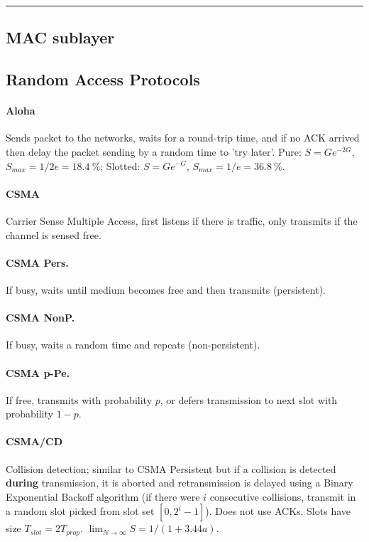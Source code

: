 \documentclass{form}
\begin{document}
\vspace{-1.5em}\rule{\textwidth}{1.0pt}\vspace{-1.0em}

\begin{multicols}{3}
    \section*{MAC sublayer}
    \subsection*{Random Access Protocols}
    \paragraph{Aloha     }
    Sends packet to the networks, waits for a round-trip time, and if no ACK arrived then delay the packet sending by a random time to 'try later'. Pure: $S=Ge^{-2G}$, $S_{max}=1/2e=\SI{18.4}{\percent}$; Slotted: $S=Ge^{-G}$, $S_{max}=1/e=\SI{36.8}{\percent}$.

    \paragraph{CSMA      }
    Carrier Sense Multiple Access, first listens if there is traffic, only transmits if the channel is sensed free.

    \paragraph{CSMA Pers.}
    If busy, waits until medium becomes free and then transmits (persistent).

    \paragraph{CSMA NonP.}
    If busy, waits a random time and repeats (non-persistent).

    \paragraph{CSMA p-Pe.}
    If free, transmits with probability $p$, or defers transmission to next slot with probability $1-p$.

    \paragraph{CSMA/CD   }
    Collision detection; similar to CSMA Persistent but if a collision is detected \textbf{during} transmission, it is aborted and retransmission is delayed using a Binary Exponential Backoff algorithm (if there were $i$ consecutive collisions, transmit in a random slot picked from slot set $[0, 2^i-1]$). Does not use ACKs. Slots have size $T_{slot}=2T_{prop}$. $\displaystyle \lim_{N \rightarrow\infty}{S}=1/(1+3.44a)$.


\end{multicols}
\end{document}
